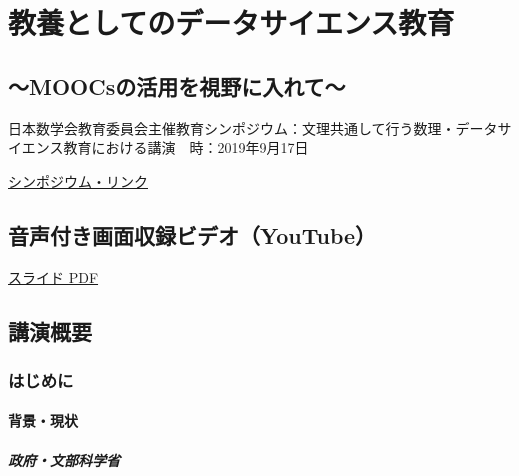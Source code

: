 \documentclass[
]{bxjsbook}
\theoremstyle{definition}
\theoremstyle{definition}
\theoremstyle{definition}
\theoremstyle{definition}
\theoremstyle{remark}
\begin{document}
\hypertarget{appendix-appendix}{%
\appendix}


\hypertarget{math2019}{%
\section{教養としてのデータサイエンス教育}\label{math2019}}

\hypertarget{moocsux306eux6d3bux7528ux3092ux8996ux91ceux306bux5165ux308cux3066}{%
\subsection*{～MOOCsの活用を視野に入れて～}\label{moocsux306eux6d3bux7528ux3092ux8996ux91ceux306bux5165ux308cux3066}}

日本数学会教育委員会主催教育シンポジウム：文理共通して行う数理・データサイエンス教育における講演　時：2019年9月17日

\href{https://www.mathsoc.jp/overview/committee/education/sympo/2019sep.html}{シンポジウム・リンク}

\hypertarget{ux97f3ux58f0ux4ed8ux304dux753bux9762ux53ceux9332ux30d3ux30c7ux30aayoutube}{%
\subsection{音声付き画面収録ビデオ（YouTube）}\label{ux97f3ux58f0ux4ed8ux304dux753bux9762ux53ceux9332ux30d3ux30c7ux30aayoutube}}

\href{https://icu-hsuzuki.github.io/datascience/ed/msj2019.pdf}{スライド PDF}

\hypertarget{ux8b1bux6f14ux6982ux8981}{%
\subsection{講演概要}\label{ux8b1bux6f14ux6982ux8981}}

\hypertarget{ux306fux3058ux3081ux306b-4}{%
\subsubsection{はじめに}\label{ux306fux3058ux3081ux306b-4}}

\hypertarget{ux80ccux666fux73feux72b6}{%
\paragraph{背景・現状}\label{ux80ccux666fux73feux72b6}}

\hypertarget{ux653fux5e9cux6587ux90e8ux79d1ux5b66ux7701}{%
\subparagraph{政府・文部科学省}\label{ux653fux5e9cux6587ux90e8ux79d1ux5b66ux7701}}
\end{document}
